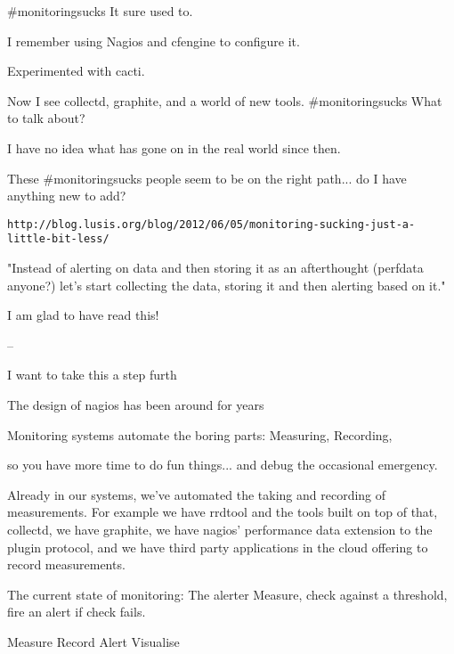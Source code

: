 \documentclass[online,12pt,helvetica]{chaksem}
\begin{document}
\begin{slide}

\end{slide}


{\#}monitoringsucks
It sure used to.

I remember using Nagios and cfengine to configure it.

Experimented with cacti.

Now I see collectd, graphite, and a world of new tools.
{\#}monitoringsucks
What to talk about?

I have no idea what has gone on in the real world since then.

These {\#}monitoringsucks people seem to be on the right path... do I have
anything new to add?

\begin{slide}
\texttt{http://blog.lusis.org/blog/2012/06/05/monitoring-sucking-just-a-little-bit-less/}

"Instead of alerting on data and then storing it as an afterthought (perfdata anyone?) let’s start collecting the
data, storing it and then alerting based on it."


I am glad to have read this!
\end{slide}

--

I want to take this a step furth

The design of nagios has been around for years

Monitoring systems
automate the boring parts:
Measuring,
Recording,

so you have more time to do fun things... and debug the occasional emergency.

Already in our systems, we've automated the taking and recording of
measurements.  For example we have rrdtool and the tools built on top of that,
collectd, we have graphite, we have nagios' performance data extension to the
plugin protocol, and we have third party applications in the cloud offering to record
measurements.

The current state of monitoring:
The alerter
Measure, check against a threshold, fire an alert if check fails.

Measure
Record
Alert
Visualise
\end{document}
